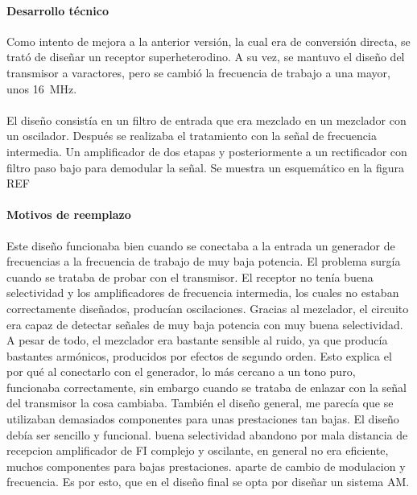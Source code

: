 \paragraph{Desarrollo técnico}
Como intento de mejora a la anterior versión, la cual era de conversión directa, se trató de diseñar un receptor superheterodino. A su vez, se mantuvo el diseño del transmisor a varactores, pero se cambió la frecuencia de trabajo a una mayor, unos \SI{16}{\mega\hertz}. 
\paragraph{}
El diseño consistía en un filtro de entrada que era mezclado en un mezclador con un oscilador. Después se realizaba el tratamiento con la señal de frecuencia intermedia. Un amplificador de dos etapas y posteriormente a un rectificador con filtro paso bajo para demodular la señal. Se muestra un esquemático en la figura REF

\paragraph{Motivos de reemplazo}
Este diseño funcionaba bien cuando se conectaba a la entrada un generador de frecuencias a la frecuencia de trabajo de muy baja potencia.
El problema surgía cuando se trataba de probar con el transmisor. 
El receptor no tenía buena selectividad y los amplificadores de frecuencia intermedia, los cuales no estaban correctamente diseñados, producían oscilaciones.
Gracias al mezclador, el circuito era capaz de detectar señales de muy baja potencia con muy buena selectividad. A pesar de todo, el mezclador era bastante sensible al ruido, ya que producía bastantes armónicos, producidos por efectos de segundo orden. Esto explica el por qué al conectarlo con el generador, lo más cercano a un tono puro, funcionaba correctamente, sin embargo cuando se trataba de enlazar con la señal del transmisor la cosa cambiaba.
También el diseño general, me parecía que se utilizaban demasiados componentes para unas prestaciones tan bajas. El diseño debía ser sencillo y funcional.
buena selectividad
abandono por mala distancia de recepcion amplificador de FI complejo y oscilante, en general no era eficiente, muchos componentes para bajas prestaciones. aparte de cambio de modulacion y frecuencia. 
Es por esto, que en el diseño final se opta por diseñar un sistema AM.
